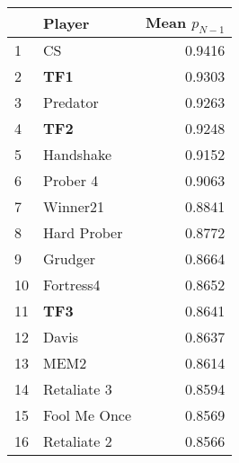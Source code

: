 \begin{tabular}{llr}
\toprule
{} &        Player &  Mean $p_{N-1}$ \\
\midrule
1  &            CS &          0.9416 \\
2  &           \textbf{TF1} &          0.9303 \\
3  &      Predator &          0.9263 \\
4  &           \textbf{TF2} &          0.9248 \\
5  &     Handshake &          0.9152 \\
6  &      Prober 4 &          0.9063 \\
7  &      Winner21 &          0.8841 \\
8  &   Hard Prober &          0.8772 \\
9  &       Grudger &          0.8664 \\
10 &     Fortress4 &          0.8652 \\
11 &           \textbf{TF3} &          0.8641 \\
12 &         Davis &          0.8637 \\
13 &          MEM2 &          0.8614 \\
14 &   Retaliate 3 &          0.8594 \\
15 &  Fool Me Once &          0.8569 \\
16 &   Retaliate 2 &          0.8566 \\
\bottomrule
\end{tabular}
